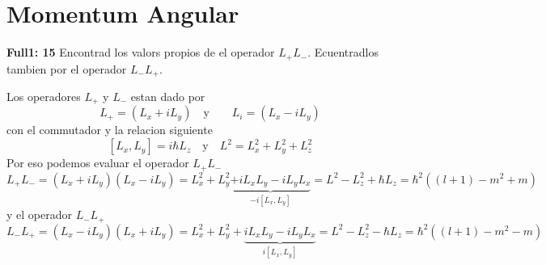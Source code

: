 \chapter{Momentum Angular}

\begin{ejercicio}
\textbf{Full1: 15} Encontrad los valors propios de el operador $L_+L_-$.
Ecuentradlos tambien por el operador $L_-L_+$.
\end{ejercicio}
\begin{solucion}
Los operadores $L_+$ y $L_-$ estan dado por
$$
	L_+ = (L_x + iL_y) \quad \text{y} \qquad L_i = (L_x - iL_y)
$$ 
con el commutador y la relacion siguiente
$$
	[L_x, L_y] = i \hbar L_z \quad \text{y} \quad L^2 = L_x^2 + L_y^2 + L_z^2
$$
Por eso podemos evaluar el operador $L_+L_-$
$$
	L_+L_- = (L_x + iL_y)(L_x - iL_y) = L_x^2 + L_y^2 \underbrace{+ iL_xL_y -
iL_y L_x}_{-i[L_x, L_y]} = L^2 - L_z^2 + \hbar L_z = \hbar^2 ((l+1) -m^2 +m)
$$
y el operador $L_-L_+$
$$
	L_-L_+ = (L_x - iL_y)(L_x + iL_y) = L_x^2 + L_y^2 + \underbrace{iL_xL_y -
iL_yL_x}_{i[L_x, L_y]} = L^2 - L_z^2 - \hbar L_z = \hbar^2 ((l+1) -m^2 -m)
$$
\end{solucion}

